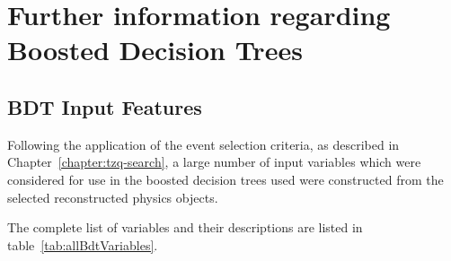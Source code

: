 \chapter{Further information regarding Boosted Decision Trees}\label{app:bdt}

\section{BDT Input Features}\label{appsec:bdtFeatures}
Following the application of the event selection criteria, as described in Chapter~\ref{chapter:tzq-search}, a large number of input variables which were considered for use in the boosted decision trees used were constructed from the selected reconstructed physics objects.

The complete list of variables and their descriptions are listed in table~\ref{tab:allBdtVariables}.


